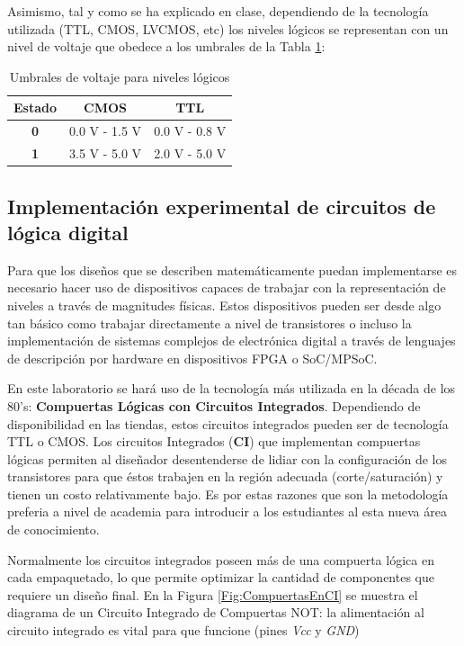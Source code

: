 Asimismo, tal y como se ha explicado en clase, dependiendo de la tecnología utilizada (TTL, CMOS, LVCMOS, etc) los niveles
lógicos se representan con un nivel de voltaje que obedece a los umbrales de la Tabla \ref{Table:umbralesLogicos}:

\begin{table}[H]
    \centering
    \begin{tabular}{|c|c|c|}
        \hline
        \textbf{Estado} & \textbf{CMOS} & \textbf{TTL}  \\ \hline
        \textbf{0}      & 0.0 V - 1.5 V & 0.0 V - 0.8 V \\ \hline
        \textbf{1}      & 3.5 V - 5.0 V & 2.0 V - 5.0 V \\ \hline
    \end{tabular}
    \caption{Umbrales de voltaje para niveles lógicos}
    \label{Table:umbralesLogicos}
\end{table}

\subsection{Implementación experimental de circuitos de lógica digital}
Para que los diseños que se describen matemáticamente puedan implementarse es necesario hacer uso de dispositivos capaces
de trabajar con la representación de niveles a través de magnitudes físicas. Estos dispositivos pueden ser desde algo tan 
básico como trabajar directamente a nivel de transistores o incluso la implementación de sistemas complejos de electrónica digital
a través de lenguajes de descripción por hardware en dispositivos FPGA o SoC/MPSoC.

En este laboratorio se hará uso de la tecnología más utilizada en la década de los 80's: 
\textbf{Compuertas Lógicas con Circuitos Integrados}. Dependiendo de disponibilidad en las tiendas, estos circuitos integrados
pueden ser de tecnología TTL o CMOS. Los circuitos Integrados (\textbf{CI}) que implementan compuertas lógicas permiten al diseñador
desentenderse de lidiar con la configuración de los transistores para que éstos trabajen en la región adecuada (corte/saturación)
y tienen un costo relativamente bajo. Es por estas razones que son la metodología preferia a nivel de academia para introducir a
los estudiantes al esta nueva área de conocimiento.

Normalmente los circuitos integrados poseen más de una compuerta lógica en cada empaquetado, lo que permite optimizar la cantidad de
componentes que requiere un diseño final. En la Figura \ref{Fig:CompuertasEnCI} se muestra el diagrama de un Circuito Integrado de
Compuertas NOT: la alimentación al circuito integrado es vital para que funcione (pines \textit{Vcc} y \textit{GND})

